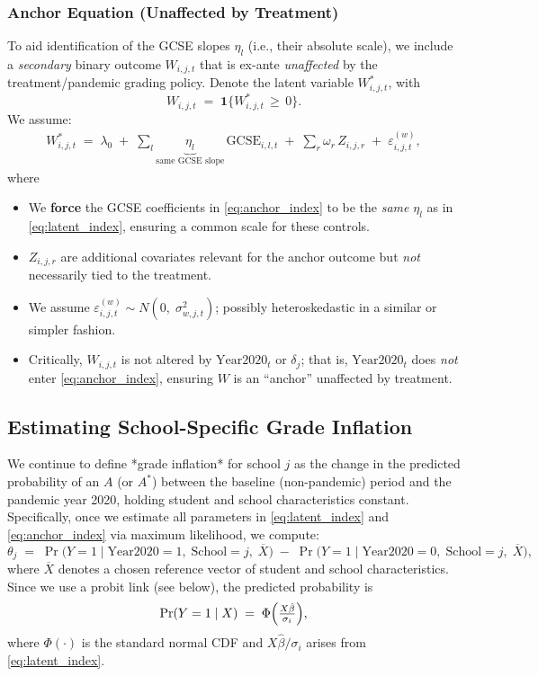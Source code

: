\subsubsection*{Anchor Equation (Unaffected by Treatment)}

To aid identification of the GCSE slopes \(\eta_l\) (i.e., their absolute scale), we include a \emph{secondary} binary outcome $W_{i,j,t}$ that is ex-ante \emph{unaffected} by the treatment/pandemic grading policy. Denote the latent variable $W_{i,j,t}^*$, with
\[
    W_{i,j,t} \;=\; \mathbf{1}\{W_{i,j,t}^* \,\ge\, 0\}.
\]
We assume:
\begin{align}
\label{eq:anchor_index}
    W_{i,j,t}^*
    \;=\;
    \lambda_0
    \;+\;
    \sum_{l}\underbrace{\eta_{l}}_{\text{same GCSE slope}}\,\text{GCSE}_{i,l,t}
    \;+\;
    \sum_{r}\omega_r\,Z_{i,j,r}
    \;+\;
    \varepsilon_{i,j,t}^{(w)},
\end{align}
where
\begin{itemize}
    \item We \textbf{force} the GCSE coefficients in \eqref{eq:anchor_index} to be the \emph{same} \(\eta_l\) as in \eqref{eq:latent_index}, ensuring a common scale for these controls.
    \item $Z_{i,j,r}$ are additional covariates relevant for the anchor outcome but \emph{not} necessarily tied to the treatment.
    \item We assume $\varepsilon_{i,j,t}^{(w)} \sim N(0,\;\sigma_{w,j,t}^2)$; possibly heteroskedastic in a similar or simpler fashion.
    \item Critically, $W_{i,j,t}$ is not altered by $\text{Year2020}_t$ or $\delta_j$; that is, \(\text{Year2020}_t\) does \emph{not} enter \eqref{eq:anchor_index}, ensuring $W$ is an “anchor” unaffected by treatment.
\end{itemize}

\subsection{Estimating School-Specific Grade Inflation}

We continue to define *grade inflation* for school $j$ as the change in the predicted probability of an $A$ (or $A^*$) between the baseline (non-pandemic) period and the pandemic year 2020, holding student and school characteristics constant. Specifically, once we estimate all parameters in \eqref{eq:latent_index} and \eqref{eq:anchor_index} via maximum likelihood, we compute:
\begin{equation}
\label{eq:grade_inflation}
\theta_j \;=\;
\Pr\bigl(Y=1 \mid \text{Year2020}=1,\;\text{School}=j,\;\overline{X}\bigr)
\;-\;
\Pr\bigl(Y=1 \mid \text{Year2020}=0,\;\text{School}=j,\;\overline{X}\bigr),
\end{equation}
where $\overline{X}$ denotes a chosen reference vector of student and school characteristics. Since we use a probit link (see below), the predicted probability is
\[
\Pr(Y=1 \mid X) \;=\; \Phi\Bigl(\tfrac{X\hat{\beta}}{\sigma_i}\Bigr),
\]
where $\Phi(\cdot)$ is the standard normal CDF and $X\hat{\beta}/\sigma_i$ arises from \eqref{eq:latent_index}.

